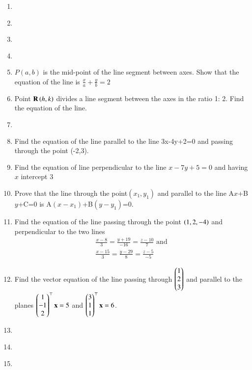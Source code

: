 \begin{enumerate}[label=\thesection.\arabic*,ref=\thesection.\theenumi]
\label{chapters/11/10/2/11}
%
\item 
\label{chapters/11/10/2/12}
%
\item 
\label{chapters/11/10/2/13}
%
\item 
\label{chapters/11/10/2/14}
%
\item 
\label{chapters/11/10/2/15}
%
\item 
$P(a,b)$ is the mid-point of the line segment between axes. Show that the equation of the line is $\frac{x}{a}+\frac{y}{b}=2$
\label{chapters/11/10/2/18}
\\
\solution
%
\item Point $\mathbf{R}\left(h, k\right)$ divides a line segment between the axes in the ratio 1: 2. Find the equation of the line.
\label{chapters/11/10/2/19}
%
\item 
\label{chapters/11/10/2/20}
%
\item Find the equation of the line  parallel to the line 3x-4y+2=0 and passing through the point (-2,3).
\label{chapters/11/10/3/7}
%
\item Find the equation of line perpendicular to the line $x-7y+5=0$ and having $x$ intercept $3$\\
\label{chapters/11/10/3/8}
\solution
%
\item Prove that the line through the point$(x_1,y_1)$ and parallel to the line A$x$+B$y$+C=0 is A$(x-x_1)$+B$(y-y_1)$=0.
\label{chapters/11/10/3/11}
\\
\solution
%
	\item Find the equation of the line passing through the point $\left(1,2,-4\right)$ and perpendicular to the two lines
\begin{align}
	\frac{x-8}{3}=\frac{y+19}{-16}=\frac{z-10}{7} \text{ and }\\ \frac{x-15}{3}=\frac{y-29}{8}=\frac{z-5}{-5} 
\end{align}
    \solution
	\item  Find the vector equation of the line passing through $\begin{pmatrix}1\\2\\3\end{pmatrix}$ and parallel to the planes $\begin{pmatrix}1\\-1\\2\end{pmatrix}^{\top}\mathbf{x} = 5$ and $\begin{pmatrix}3\\1\\1\end{pmatrix}^{\top}\mathbf{x} = 6$.  
    \solution
	\item
\label{chapters/11/10/3/12}
\item
%
\item
	\label{12.11.2.3}
 

\end{enumerate}
